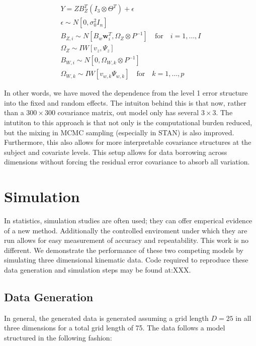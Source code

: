 \documentclass[AMA,Times1COL]{WileyNJDv5} %
\begin{document}
\begin{equation}
    \begin{split}
    Y = ZB_Z^T\left(I_3 \otimes\Theta^T\right) + \epsilon\\
    \epsilon\sim N[0, \sigma_{0}^2 I_n]\\
    B_{Z,i} \sim N[B_w \boldsymbol{w}_i^T, \Omega_Z\otimes P^{-1}]\quad \text{for} \quad i = 1,\dots, I\\
    \Omega_Z \sim IW [v_z, \Psi_z]\\
    B_{W,i} \sim N[0, \Omega_{W,k}\otimes P^{-1}]\\
    \Omega_{W,k} \sim IW[v_{w,k}\Psi_{w,k}]\quad\text{for} \quad k = 1,\dots, p
    \end{split}
\end{equation}

In other words, we have moved the dependence from the level 1 error structure into the fixed and random effects.  The intuiton behind this is that now, rather than a \(300\times 300\) covariance matrix, out model only has several \(3\times 3\).  The intutiton to this approach is that not only is the computational burden reduced, but the mixing in MCMC sampling (especially in STAN) is also improved.  Furthermore, this also allows for more interpretable covariance structures at the subject and covariate levels.  This setup allows for data borrowing across dimensions without forcing the residual error covariance to absorb all variation.  

\section{Simulation}\label{sec3}
In statistics, simulation studies are often used; they can offer emperical evidence of a new method.  Additionally the controlled enviroment under which they are run allows for easy measurement of accuracy and repeatability.  This work is no different.  We demonstrate the performance of these two competing models by simulating three dimensional kinematic data.  Code required to reproduce these data generation and simulation steps may be found at:XXX.  

\subsection{Data Generation}
In general, the generated data is generated assuming a grid length \(D = 25\) in all three dimensions for a total grid length of 75.  The data follows a model structured in the following fashion:
\end{document}
